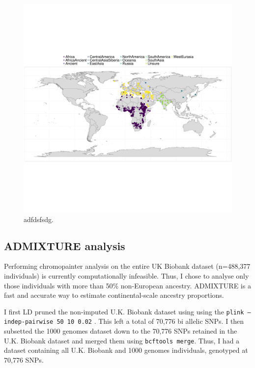 \begin{figure}
    \centering
    \includegraphics[width=1.0\textwidth]{../images/chapter3/HumanOriginsMap.pdf}
    \caption{adfdsfsdg.}
    \label{fig:HumanOriginsMap}
\end{figure}

\subsection{ADMIXTURE analysis}

Performing chromopainter analysis on the entire UK Biobank dataset (n=488,377 individuals) is currently computationally infeasible. Thus, I chose to analyse only those individuals with more than 50\% non-European ancestry. ADMIXTURE is a fast and accurate way to estimate continental-scale ancestry proportions.

I first LD pruned the non-imputed U.K. Biobank dataset using using the \texttt{plink --indep-pairwise 50 10 0.02} \cite{purcell2007plink}. This left a total of  70,776 bi allelic SNPs. I then subsetted the 1000 genomes dataset down to the 70,776 SNPs retained in the U.K. Biobank dataset and merged them using \texttt{bcftools merge}. Thus, I had a dataset containing all U.K. Biobank and 1000 genomes individuals, genotyped at 70,776 SNPs.

